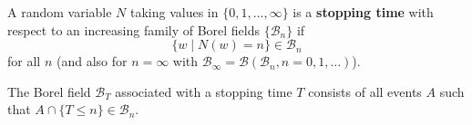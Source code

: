 A random variable $N$ taking values in $\{0, 1, \ldots, \infty\}$ is a \textbf{stopping time} with respect to an increasing family of Borel fields $\{\mathcal{B}_n\}$ if
$$\{w \mid N(w) = n\} \in \mathcal{B}_n$$
for all $n$ (and also for $n = \infty$ with $\mathcal{B}_\infty = \mathcal{B}(\mathcal{B}_n, n = 0, 1, \ldots)$).

The Borel field $\mathcal{B}_T$ associated with a stopping time $T$ consists of all events $A$ such that $A \cap \{T \leq n\} \in \mathcal{B}_n$.
